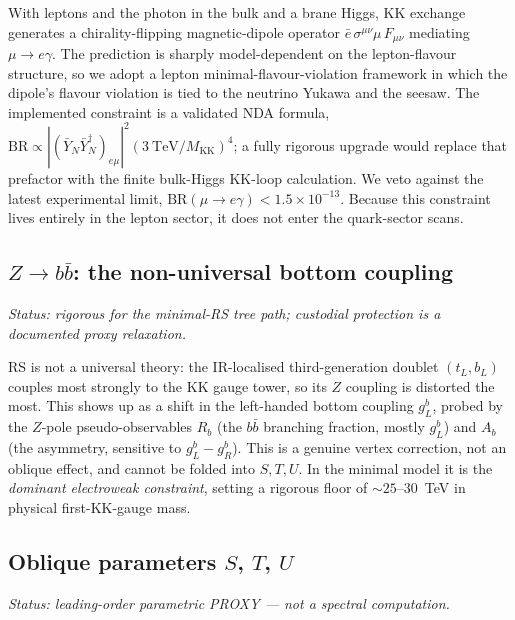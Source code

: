 \documentclass[11pt]{article}
\newcommand{\MKK}{M_{\mathrm{KK}}}
\begin{document}
With leptons and the photon in the bulk and a brane Higgs, KK exchange generates
a chirality-flipping magnetic-dipole operator
$\bar e\,\sigma^{\mu\nu}\mu\,F_{\mu\nu}$ mediating $\mu\to e\gamma$. The
prediction is sharply model-dependent on the lepton-flavour structure, so we
adopt a lepton minimal-flavour-violation framework in which the dipole's flavour
violation is tied to the neutrino Yukawa and the seesaw. The implemented
constraint is a validated NDA formula,
$\mathrm{BR}\propto |(\bar Y_N\bar Y_N^\dagger)_{e\mu}|^2(3~\mathrm{TeV}/\MKK)^4$;
a fully rigorous upgrade would replace that prefactor with the finite bulk-Higgs
KK-loop calculation. We veto against the latest experimental limit,
$\mathrm{BR}(\mu\to e\gamma) < 1.5\times10^{-13}$.
Because this constraint lives entirely in the lepton sector, it does not enter
the quark-sector scans.

\subsection{$Z\to b\bar b$: the non-universal bottom coupling}

\emph{Status: rigorous for the minimal-RS tree path; custodial protection is a
documented proxy relaxation.}

RS is not a universal theory: the IR-localised third-generation doublet
$(t_L,b_L)$ couples most strongly to the KK gauge tower, so its $Z$ coupling is
distorted the most. This shows up as a shift in the left-handed bottom coupling
$g_L^b$, probed by the $Z$-pole pseudo-observables $R_b$ (the $b\bar b$ branching
fraction, mostly $g_L^b$) and $A_b$ (the asymmetry, sensitive to
$g_L^b - g_R^b$). This is a genuine vertex correction, not an oblique effect, and
cannot be folded into $S,T,U$. In the minimal model it is the \emph{dominant
electroweak constraint}, setting a rigorous floor of $\sim 25$--$30$~TeV in
physical first-KK-gauge mass.

\subsection{Oblique parameters $S$, $T$, $U$}

\emph{Status: leading-order parametric PROXY --- not a spectral computation.}
\end{document}
